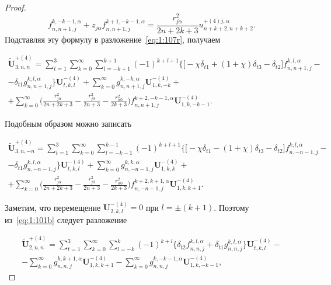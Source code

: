 \begin{russian}
\begin{proof}
\begin{equation*}
{f}_{n,n+1,j}^{k,-k-1,\alpha}+z_{j\alpha}{f}_{n,n+1,j}^{k+1,-k-1,\alpha}=\frac{r_{j\alpha}^2}{2n+2k+3}u_{n+k+2,n+k+2}^{+(4)j,\alpha}.
\end{equation*}
Подставляя эту формулу в разложение~\eqref{eq:1:107r}, получаем

\begin{multline}
\mathbf{\tilde U}_{3,n,n}^{+(4)}=\sum\limits_{t=1}^3\sum\limits_{k=0}^\infty\sum\limits_{l=-k+1}^{k+1}(-1)^{k+l+1}\bigg\{\bigg\lbrack-\chi\delta_{t1}+(1+\chi)\delta_{t3}-\delta_{t2}
\bigg\rbrack{f}_{n,n+1,j}^{k,l,\alpha}- \\
-\delta_{t1}{g}_{n,n+1,j}^{k,l,\alpha}\bigg\}\mathbf{U}_{t,k,l}^{-(4)}+\sum\limits_{k=0}^\infty{g}_{n,n+1,j}^{k,-k,\alpha}\mathbf{U}_{1,k,-k}^{-(4)}+ \\
+\sum\limits_{k=0}^\infty
\bigg(\frac{r_{j\alpha}^2}{2n+2k+3}-\frac{r_{j0}^2}{2n+3}-\frac{r_{\alpha 0}^2}{2k+3}\bigg){f}_{n,n+1,j}^{k+2,-k-1,\alpha}\mathbf{U}_{1,k,-k-1}^{-(4)}.
\label{eq:1:109r}
\end{multline}

Подобным образом можно записать

\begin{multline}
\mathbf{\tilde U}_{3,n,-n}^{+(4)}=\sum\limits_{t=1}^3\sum\limits_{k=0}^\infty\sum\limits_{l=-k-1}^{k-1}(-1)^{k+l+1}\bigg\{\bigg\lbrack-\chi\delta_{t1}-(1+\chi)\delta_{t3}-\delta_{t2}
\bigg\rbrack{f}_{n,-n-1,j}^{k,l,\alpha}- \\
-\delta_{t1}{g}_{n,-n-1,j}^{k,l,\alpha}\bigg\}\mathbf{U}_{t,k,l}^{-(4)}+\sum\limits_{k=0}^\infty{g}_{n,-n-1,j}^{k,k,\alpha}\mathbf{U}_{1,k,k}^{-(4)}+ \\
+\sum\limits_{k=0}^\infty
\bigg(\frac{r_{j\alpha}^2}{2n+2k+3}-\frac{r_{j0}^2}{2n+3}-\frac{r_{\alpha 0}^2}{2k+3}\bigg){f}_{n,-n-1,j}^{k+2,k+1,\alpha}\mathbf{U}_{1,k,k+1}^{-(4)}.
\label{eq:1:110r}
\end{multline}

Заметим, что перемещение $\mathbf{U}_{2,k,l}^{-(4)}=0$ при $l=\pm(k+1)$. Поэтому из~\eqref{eq:1:101b} следует разложение

\begin{multline}
\mathbf{\tilde U}_{2,n,n}^{+(4)}=\sum\limits_{t=1}^3\sum\limits_{k=0}^\infty\sum\limits_{l=-k}^{k}(-1)^{k+l}\bigg\{\delta_{t2}{f}_{n,n,j}^{k,l,\alpha}+\delta_{t1}{g}_{n,n,j}^{k,l,\alpha}\bigg\}\mathbf{U}_{t,k,l}^{-(4)}- \\
-\sum\limits_{k=0}^\infty{g}_{n,n,j}^{k,k+1,\alpha}\mathbf{U}_{1,k,k+1}^{-(4)}-\sum\limits_{k=0}^\infty{g}_{n,n,j}^{k,-k-1,\alpha}\mathbf{U}_{1,k,-k-1}^{-(4)},
\label{eq:1:112r}
\end{multline}


\end{proof}
\end{russian}
